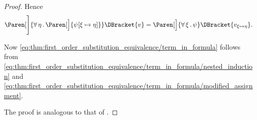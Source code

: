 \begin{proof}
  Hence
  \begin{equation}\label{eq:thm:first_order_substitution_equivalence/term_in_formula/modified_assignment}
    \Paren[\Bigg]{\Qnt{\forall}{\eta} \Paren[\Big]{ \psi[\xi \mapsto \eta] } }\DBracket{v}
    =
    \Paren[\Big]{\Qnt{\forall}{\xi} \psi }\DBracket{v_{\xi \mapsto \eta}}.
  \end{equation}

  Now \eqref{eq:thm:first_order_substitution_equivalence/term_in_formula} follows from \eqref{eq:thm:first_order_substitution_equivalence/term_in_formula/nested_induction} and \eqref{eq:thm:first_order_substitution_equivalence/term_in_formula/modified_assignment}.

   The proof is analogous to that of .
\end{proof}
